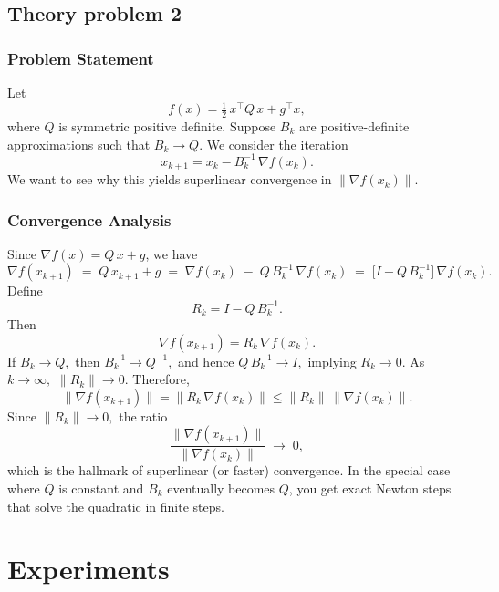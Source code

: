 \documentclass[a4paper,12pt]{article}
\begin{document}
\subsection{Theory problem 2}
\subsubsection*{Problem Statement}
Let
\[
  f(x) 
  = 
  \tfrac12 \, x^\top Q\,x 
  + 
  g^\top x,
\]
where $Q$ is symmetric positive definite. Suppose $B_k$ are positive-definite approximations such that $B_k \to Q$. We consider the iteration
\[
  x_{k+1} 
  = 
  x_k 
  - 
  B_k^{-1} \,\nabla f(x_k).
\]
We want to see why this yields superlinear convergence in $\|\nabla f(x_k)\|$.

\subsubsection*{Convergence Analysis}
Since $\nabla f(x) = Q\,x + g$, we have
\[
  \nabla f(x_{k+1})
  \;=\;
  Q\,x_{k+1} + g
  \;=\;
  \nabla f(x_k) 
  \;-\;
  Q\, B_k^{-1}\,\nabla f(x_k)
  \;=\;
  \bigl[I - Q\,B_k^{-1}\bigr]\,
  \nabla f(x_k).
\]
Define
\[
  R_k
  = 
  I - Q\,B_k^{-1}.
\]
Then
\[
  \nabla f(x_{k+1})
  =
  R_k\,\nabla f(x_k).
\]
If $B_k \to Q,$ then $B_k^{-1}\to Q^{-1},$ and hence $Q\,B_k^{-1}\to I,$ implying $R_k \to 0$. As $k\to\infty,$ $\|R_k\|\to 0.$ Therefore,
\[
  \|\nabla f(x_{k+1})\|
  =
  \| R_k\,\nabla f(x_k)\|
  \le
  \|R_k\|\,
  \|\nabla f(x_k)\|.
\]
Since $\|R_k\|\to 0,$ the ratio
\[
  \frac{\|\nabla f(x_{k+1})\|}{\|\nabla f(x_k)\|}
  \;\to\;
  0,
\]
which is the hallmark of superlinear (or faster) convergence. In the special case where $Q$ is constant and $B_k$ eventually becomes $Q$, you get exact Newton steps that solve the quadratic in finite steps.
\section{Experiments}

\end{document}
